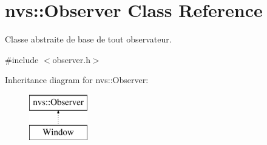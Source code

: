 \hypertarget{classnvs_1_1_observer}{}\section{nvs\+:\+:Observer Class Reference}
\label{classnvs_1_1_observer}


Classe abstraite de base de tout observateur.  




{\ttfamily \#include $<$observer.\+h$>$}

Inheritance diagram for nvs\+:\+:Observer\+:\begin{figure}[H]
\begin{center}
\leavevmode
\includegraphics[height=2.000000cm]{classnvs_1_1_observer}
\end{center}
\end{figure}
